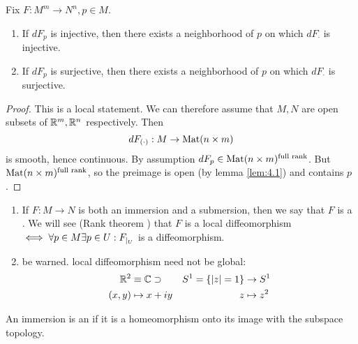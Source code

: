 \begin{lemma}\label{lem:4.2}
    Fix \(F:M^m\to N^n,p\in M\).
    \begin{enumerate}
        \item If \(dF_p\) is injective, then there exists a neighborhood of \(p\) on which 
              \(dF_{\cdot}\) is injective. 
        \item If \(dF_p\) is surjective, then there exists a neighborhood of \(p\) on which 
        \(dF_{\cdot}\) is surjective. 
    \end{enumerate}
\end{lemma}

\begin{proof}
    This is a local statement. We can therefore assume that \(M,N\) are open subsets of \(\mathbb{R}^m,\mathbb{R}^n\) respectively.
    Then \[dF_{(\cdot)}:M\to {\text{Mat}}(n\times m)\] 
    is smooth, hence continuous. By assumption \(dF_p\in {\text{Mat}}(n\times m)^{\text{full rank}}\). But \({\text{Mat}}(n\times m)^{\text{full rank}}\), so 
    the preimage is open (by lemma \ref{lem:4.1}) and contains \(p\).
\end{proof}

\begin{remark}
    \begin{enumerate} %
        \item If \(F:M\to N\) is both an immersion and a submersion, then we say that \(F\) is a . We will see (Rank theorem %
        ) that \(F\) is a local diffeomorphism \(\iff\forall p\in M\exists p\in U: F_{|_{U}}\) is a diffeomorphism.
        \item be warned. local diffeomorphism need not be global: \begin{align*}
            \mathbb{R}^2&\equiv \mathbb{C}\supset &S^1=\{|z|=1\}&\to S^1\\
            (x,y)&\mapsto x+iy& z&\mapsto z^2
        \end{align*}
    \end{enumerate}
\end{remark}

\begin{definition*}
    An immersion is an  if it is a homeomorphism onto its image 
    with the subspace topology.
\end{definition*}

